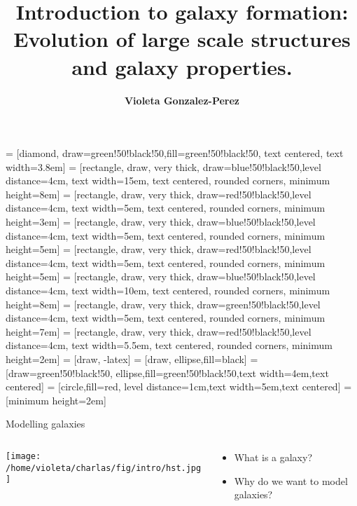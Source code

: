 \documentclass{beamer}
\title{Introduction to galaxy formation: \\ Evolution of large scale structures and galaxy properties.
}
\author{{\bf Violeta Gonzalez-Perez}}
\institute{@violegp
}
\date{}
\begin{document}


 = [diamond, draw=green!50!black!50,fill=green!50!black!50, text centered, text width=3.8em]
 = [rectangle, draw, very thick,
draw=blue!50!black!50,level distance=4cm,
    text width=15em, text centered, rounded corners, minimum height=8em]
 = [rectangle, draw, very thick,
draw=red!50!black!50,level distance=4cm,
    text width=5em, text centered, rounded corners, minimum height=3em]
 = [rectangle, draw, very thick,
draw=blue!50!black!50,level distance=4cm,
    text width=5em, text centered, rounded corners, minimum height=5em]
 = [rectangle, draw, very thick,
draw=red!50!black!50,level distance=4cm,
    text width=5em, text centered, rounded corners, minimum height=5em]
 = [rectangle, draw, very thick,
draw=blue!50!black!50,level distance=4cm,
    text width=10em, text centered, rounded corners, minimum height=8em]
 = [rectangle, draw, very thick,
draw=green!50!black!50,level distance=4cm,
    text width=5em, text centered, rounded corners, minimum height=7em]
 = [rectangle, draw, very thick,
draw=red!50!black!50,level distance=4cm,
    text width=5.5em, text centered, rounded corners, minimum height=2em]
 = [draw, -latex]
 = [draw, ellipse,fill=black]   
 = [draw=green!50!black!50, ellipse,fill=green!50!black!50,text width=4em,text centered]   
 = [circle,fill=red, level distance=1cm,text width=5em,text centered]   
 = [minimum height=2em]   


\begin{frame}{Modelling galaxies}
\begin{columns}
\begin{column}{7cm}
\begin{center}
   \texttt{[image: /home/violeta/charlas/fig/intro/hst.jpg]}
\end{center}
\end{column}
\begin{column}{6cm}
\begin{itemize}
\item What is a galaxy?
\item Why do we want to model galaxies?
\end{itemize}
\end{column}
\end{columns}
\end{frame}
\end{document}
